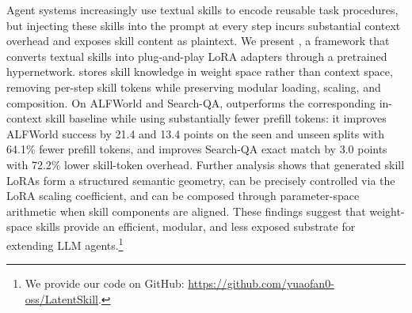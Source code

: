 Agent systems increasingly use textual skills to encode reusable task procedures, but injecting these skills into the prompt at every step incurs substantial context overhead and exposes skill content as plaintext. We present \textbf{\method{}}, a framework that converts textual skills into plug-and-play LoRA adapters through a pretrained hypernetwork. \method{} stores skill knowledge in weight space rather than context space, removing per-step skill tokens while preserving modular loading, scaling, and composition. On ALFWorld and Search-QA, \method{} outperforms the corresponding in-context skill baseline while using substantially fewer prefill tokens: it improves ALFWorld success by 21.4 and 13.4 points on the seen and unseen splits with 64.1\% fewer prefill tokens, and improves Search-QA exact match by 3.0 points with 72.2\% lower skill-token overhead. Further analysis shows that generated skill LoRAs form a structured semantic geometry, can be precisely controlled via the LoRA scaling coefficient, and can be composed through parameter-space arithmetic when skill components are aligned. 
These findings suggest that weight-space skills provide an efficient, modular, and less exposed substrate for extending LLM agents.\footnote{We provide our code on GitHub: \url{https://github.com/yuaofan0-oss/LatentSkill}.}